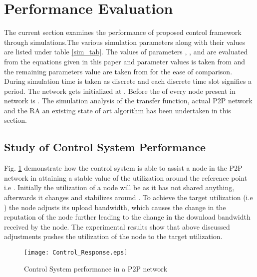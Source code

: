 \documentclass[journal]{IEEEtran}
\begin{document}
\section{Performance Evaluation}
\label{Performance_Evaluation}
The current section examines the performance of proposed control framework through simulations.The various simulation parameters along with their values are listed under table \ref{sim_tab}. The values of parameters , , and  are evaluated from the equations given in this paper and parameter  values is taken from \cite{cntrol} and the remaining parameters value are taken from \cite{Satsiou} for the ease of comparison. During simulation time is taken as discrete and each discrete time slot signifies a period. The network gets initialized  at . Before  the  of every node present in network is . The simulation analysis of the transfer function, actual P2P network and the RA \cite{Satsiou} an existing state of art algorithm has been undertaken in this section.
\subsection{Study of Control System Performance}
Fig. \ref{Control_Performance} demonstrate how the control system is able to assist a node  in the P2P network in attaining a stable value of the utilization  around the reference point i.e . Initially the utilization of a node will be  as it has not shared anything, afterwards it changes and  stabilizes around . To achieve the target utilization (i.e ) the node adjusts its upload bandwidth, which causes the change in the reputation of the node further leading to the change in the download bandwidth received by the node. The experimental results show that above discussed adjustments pushes the utilization of the node to the target utilization.
\begin{figure}[!t]
	\centering
	\texttt{[image: Control\_Response.eps]}
	\caption{Control System performance in a P2P network}
	\label{Control_Performance}
\end{figure}  
\end{document}
